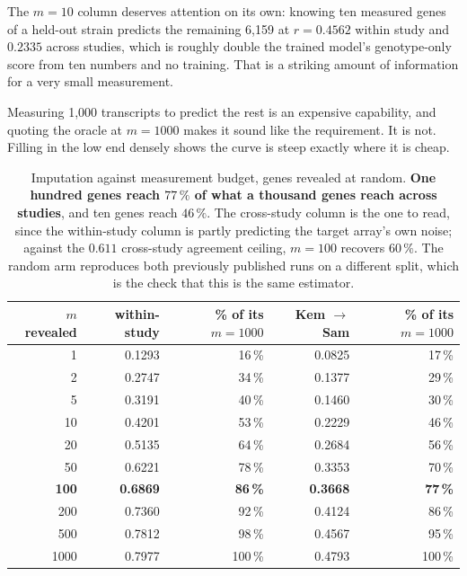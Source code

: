  The
$m = 10$ column deserves attention on its own: knowing ten measured genes of a held-out
strain predicts the remaining 6,159 at $r = 0.4562$ within study and $0.2335$ across studies,
which is roughly double the trained model's genotype-only score from ten numbers and no
training. That is a striking amount of information for a very small measurement.

 Measuring 1,000 transcripts to predict
the rest is an expensive capability, and quoting the oracle at $m = 1000$ makes it sound like
the requirement. It is not. Filling in the low end densely shows the curve is steep exactly
where it is cheap.

\begin{table}[htbp]
\centering\small
\begin{tabular}{rrrrr}
\toprule
$m$ revealed & within-study & \% of its $m{=}1000$ & Kem $\to$ Sam & \% of its $m{=}1000$ \\
\midrule
1    & 0.1293 & 16\,\% & 0.0825 & 17\,\% \\
2    & 0.2747 & 34\,\% & 0.1377 & 29\,\% \\
5    & 0.3191 & 40\,\% & 0.1460 & 30\,\% \\
10   & 0.4201 & 53\,\% & 0.2229 & 46\,\% \\
20   & 0.5135 & 64\,\% & 0.2684 & 56\,\% \\
50   & 0.6221 & 78\,\% & 0.3353 & 70\,\% \\
\textbf{100}  & \textbf{0.6869} & \textbf{86\,\%} & \textbf{0.3668} & \textbf{77\,\%} \\
200  & 0.7360 & 92\,\% & 0.4124 & 86\,\% \\
500  & 0.7812 & 98\,\% & 0.4567 & 95\,\% \\
1000 & 0.7977 & 100\,\% & 0.4793 & 100\,\% \\
\bottomrule
\end{tabular}
\caption[]{Imputation against measurement budget, genes revealed at random.
\textbf{One hundred genes reach $77\,\%$ of what a thousand genes reach across studies}, and
ten genes reach $46\,\%$. The cross-study column is the one to read, since the within-study
column is partly predicting the target array's own noise; against the $0.611$ cross-study
agreement ceiling, $m = 100$ recovers $60\,\%$. The random arm reproduces both previously
published runs on a different split, which is the check that this is the same estimator.}
\label{tab:gene-budget}
\end{table}

